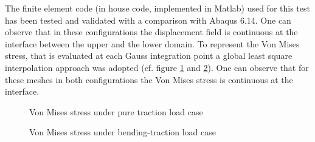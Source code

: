     The finite element code (in house code, implemented in Matlab) used for this test has been tested and validated with a comparison with Abaqus 6.14.
    One can observe that in these configurations the displacement field is continuous at the interface between the upper and the lower domain. 
    To represent the Von Mises stress, that is evaluated at each Gauss integration point a global least square interpolation approach \cite{hinton1974local} was adopted  (cf. figure \ref{fig.17} and \ref{fig.18}). One can observe that for these meshes in both configurations the Von Mises stress is continuous at the interface. 
 \newpage
    \begin{figure}[!ht]
    \centering
      \caption{Von Mises stress under pure traction load case}
      \label{fig.17}
    \end{figure}
    \begin{figure}[!ht]
    \centering
      \caption{Von Mises stress under bending-traction load case }
      \label{fig.18}
    \end{figure}
 \newpage
